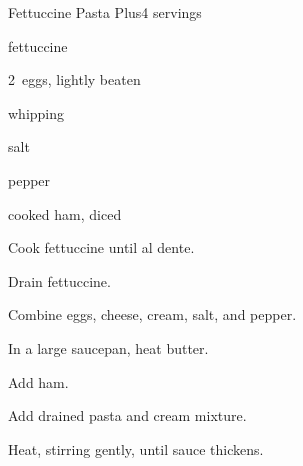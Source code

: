 \begin{recipe}{Fettuccine Pasta Plus}{}{4 servings}

\begin{ingredients}
\item {} fettuccine
\item 2~eggs, lightly beaten
\item \C{\twothird} 
\item {} whipping 
\item salt
\item pepper
\item {}
\item {} cooked ham, diced
\end{ingredients}

\begin{directions}
\item Cook fettuccine until al dente.
\item Drain fettuccine.
\item Combine eggs, cheese, cream, salt, and pepper.
\item In a large saucepan, heat butter.
\item Add ham.
\item Add drained pasta and cream mixture.
\item Heat, stirring gently, until sauce thickens.
\end{directions}

\end{recipe}
